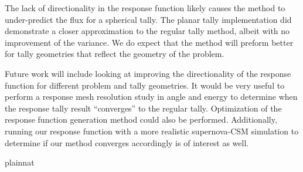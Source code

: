 The lack of directionality in the response function likely causes the method to under-predict the flux for a spherical tally. The planar tally implementation did demonstrate a closer approximation to the regular tally method, albeit with no improvement of the variance. We do expect that the method will preform better for tally geometries that reflect the geometry of the problem.

Future work will include looking at improving the directionality of the response function for different problem and tally geometries. It would be very useful to perform a response mesh resolution study in angle and energy to determine when the response tally result ``converges'' to the regular tally. Optimization of the response function generation method could also be performed. Additionally, running our response function with a more realistic supernova-CSM simulation to determine if our method converges accordingly is of interest as well.

%
{}{}

 {plainnat}


